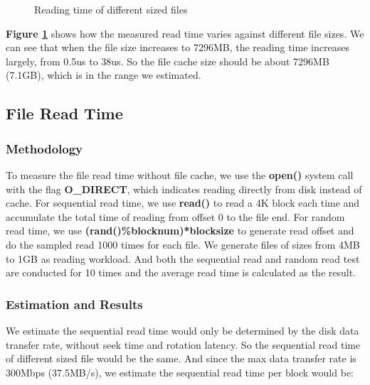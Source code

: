 \begin{figure}[ht]
    \centering
    \caption{Reading time of different sized files}
    \label{file_cache_size}
\end{figure}

\textbf{Figure \ref{file_cache_size}} shows how the measured read time varies against different file sizes. We can see that when the file size increases to 7296MB, the reading time increases largely, from 0.5us to 38us. So the file cache size should be about 7296MB (7.1GB), which is in the range we estimated.

\subsection{File Read Time}
\label {File_read_time_section}
\subsubsection{Methodology}
To measure the file read time without file cache, we use the \textbf{open()} system call with the flag \textbf{O\_DIRECT}, which indicates reading directly from disk instead of cache. For sequential read time, we use \textbf{read()} to read a 4K block each time and accumulate the total time of reading from offset 0 to the file end. For random read time, we use \textbf{(rand()\%blocknum)*blocksize} to generate read offset and do the sampled read 1000 times for each file. We generate files of sizes from 4MB to 1GB as reading workload. And both the sequential read and random read test are conducted for 10 times and the average read time is calculated as the result.

\subsubsection{Estimation and Results}
We estimate the sequential read time would only be determined by the disk data transfer rate, without seek time and rotation latency. So the sequential read time of different sized file would be the same. And since the max data transfer rate is 300Mbps (37.5MB/s), we estimate the sequential read time per block would be:

